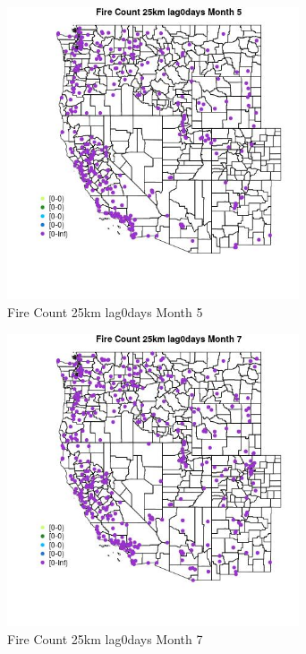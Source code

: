 \begin{figure} 
\centering  
\includegraphics[width=0.77\textwidth]{Code_Outputs/Report_ML_input_PM25_Step4_part_e_de_duplicated_aves_compiled_2019-05-18wNAs_MapObsMo5Fire_Count_25km_lag0days.jpg} 
\caption{\label{fig:Report_ML_input_PM25_Step4_part_e_de_duplicated_aves_compiled_2019-05-18wNAsMapObsMo5Fire_Count_25km_lag0days}Fire Count 25km lag0days Month 5} 
\end{figure} 
 

\begin{figure} 
\centering  
\includegraphics[width=0.77\textwidth]{Code_Outputs/Report_ML_input_PM25_Step4_part_e_de_duplicated_aves_compiled_2019-05-18wNAs_MapObsMo7Fire_Count_25km_lag0days.jpg} 
\caption{\label{fig:Report_ML_input_PM25_Step4_part_e_de_duplicated_aves_compiled_2019-05-18wNAsMapObsMo7Fire_Count_25km_lag0days}Fire Count 25km lag0days Month 7} 
\end{figure} 
 

